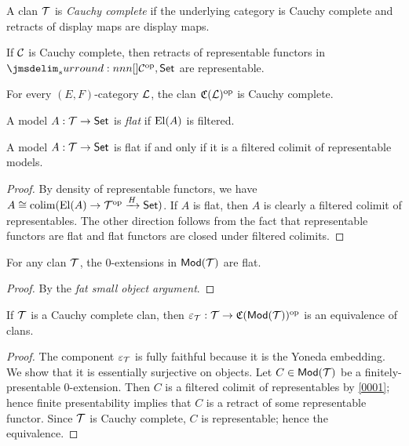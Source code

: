 \documentclass[a4paper]{article}
\begin{document}
\begin{definition}
  A clan $\mathcal{T}$ is \emph{Cauchy complete} if the underlying category is Cauchy complete and retracts of display maps are display maps.
\end{definition}

\begin{remark}
  If $\mathcal{C}$ is Cauchy complete, then retracts of representable functors in $\funCat{\cC\op}{\Set}$ are representable.
\end{remark}

\begin{remark}
  For every $(E,F)$-category $\mathcal{L}$, the clan $\mathfrak{C}(\mathcal{L})^{\mathrm{op}}$ is Cauchy complete.
\end{remark}

\begin{definition}
  A model $A : \mathcal{T} \to \mathsf{Set}$ is \emph{flat} if $\operatorname{El}(A)$ is filtered.
\end{definition}

\begin{lemma}
  A model $A : \mathcal{T} \to \mathsf{Set}$ is flat if and only if it is a filtered colimit of representable models.
\end{lemma}
\begin{proof}
  By density of representable functors, we have $A \cong \operatorname{colim}(\operatorname{El}(A) \to \mathcal{T}^{\mathrm{op}} \xrightarrow{H} \mathsf{Set})$.
  If $A$ is flat, then $A$ is clearly a filtered colimit of representables.
  The other direction follows from the fact that representable functors are flat and flat functors are closed under filtered colimits.
\end{proof}

\begin{corollary}\label{0001}
  For any clan $\mathcal{T}$, the 0-extensions in $\mathsf{Mod}(\mathcal{T})$ are flat.
\end{corollary}
\begin{proof}
  By the \emph{fat small object argument}.
\end{proof}

\begin{theorem}
  If $\mathcal{T}$ is a Cauchy complete clan, then $\varepsilon_{\mathcal{T}} : \mathcal{T} \to \mathfrak{C}(\mathsf{Mod}(\mathcal{T}))^{\mathrm{op}}$ is an equivalence of clans.
\end{theorem}
\begin{proof}
  The component $\varepsilon_{\mathcal{T}}$ is fully faithful because it is the Yoneda embedding.
  We show that it is essentially surjective on objects.
  Let $C \in \mathsf{Mod}(\mathcal{T})$ be a finitely-presentable 0-extension.
  Then $C$ is a filtered colimit of representables by \cref{0001}; hence finite presentability implies that $C$ is a retract of some representable functor.
  Since $\mathcal{T}$ is Cauchy complete, $C$ is representable; hence the equivalence.
\end{proof}
\end{document}
